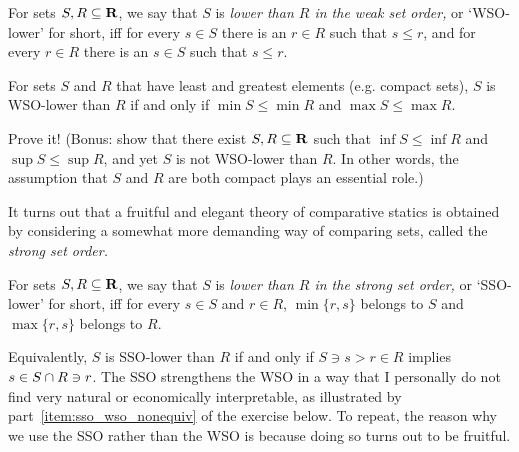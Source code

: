 \begin{definition}
	\label{definition:wso}
	For sets $S,R \subseteq \mathbf{R}$, we say that $S$ is \emph{lower than $R$ in the weak set order,} or `WSO-lower' for short, iff for every $s \in S$ there is an $r \in R$ such that $s \leq r$, and for every $r \in R$ there is an $s \in S$ such that $s \leq r$.
\end{definition}

For sets $S$ and $R$ that have least and greatest elements (e.g. compact sets), $S$ is WSO-lower than $R$ if and only if $\min S \leq \min R$ and $\max S \leq \max R$.

\begin{exercise}
	\label{exercise:wso_pf}
	Prove it! (Bonus: show that there exist $S,R \subseteq \mathbf{R}$ such that $\inf S \leq \inf R$ and $\sup S \leq \sup R$, and yet $S$ is not WSO-lower than $R$. In other words, the assumption that $S$ and $R$ are both compact plays an essential role.)
\end{exercise}

It turns out that a fruitful and elegant theory of comparative statics is obtained by considering a somewhat more demanding way of comparing sets, called the \emph{strong set order.}

\begin{definition}
	\label{definition:sso}
	For sets $S,R \subseteq \mathbf{R}$, we say that $S$ is \emph{lower than $R$ in the strong set order,} or `SSO-lower' for short, iff for every $s \in S$ and $r \in R$, $\min\{r,s\}$ belongs to $S$ and $\max\{r,s\}$ belongs to $R$.
\end{definition}

Equivalently, $S$ is SSO-lower than $R$ if and only if $S \ni s > r \in R$ implies $s \in S \cap R \ni r$. The SSO strengthens the WSO in a way that I personally do not find very natural or economically interpretable, as illustrated by part~\ref{item:sso_wso_nonequiv} of the exercise below. To repeat, the reason why we use the SSO rather than the WSO is because doing so turns out to be fruitful.

